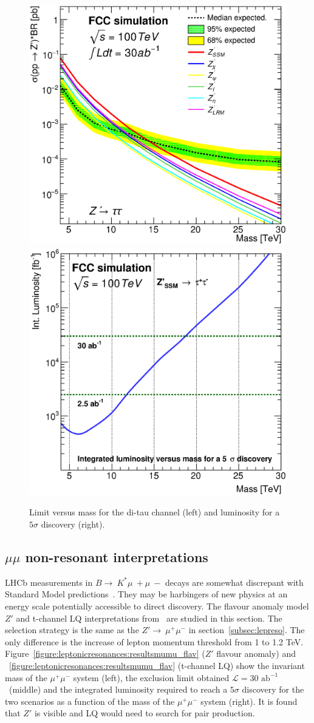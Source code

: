 \documentclass{cernrep}
\newcommand*{\intlumifcc}{\ensuremath{\mathcal{L}=30\text{ ab}^{-1}}}
\begin{document}
\begin{figure}[!htb]
  \centering
  \includegraphics[width=0.33\columnwidth]{Fig/lim_Zprime_tautau_fcc_v02_allxs.eps}
  \includegraphics[width=0.33\columnwidth]{Fig/DiscoveryPotential_tautau_rootStyle.eps}
  \caption{Limit versus mass for the di-tau channel (left) and luminosity for a $5\sigma$ discovery (right). }
  \label{figure:leptonicresonances:resultstautau}
\end{figure}


\subsection{\texorpdfstring{$\mu\mu$}{uu} non-resonant interpretations}
LHCb measurements in $B\rightarrow~K^*\mu~+\mu~−$ decays are somewhat discrepant with Standard Model predictions~\cite{Aaij:2014ora,Aaij:2017vbb}. They may be harbingers of new physics at an energy scale potentially accessible to direct discovery. The flavour anomaly model $Z'$ and t-channel LQ interpretations from~\cite{Allanach:2017bta} are studied in this section.
\newline
The selection strategy is the same as the $Z'\rightarrow~\mu^+\mu^-$ in section~\ref{subsec:lepreso}. The only difference is the increase of lepton momentum threshold from 1 to 1.2 TeV.
\newline
Figure~\ref{figure:leptonicresonances:resultsmumu_flav} ($Z'$ flavour anomaly) and ~\ref{figure:leptonicresonances:resultsmumu_flav} (t-channel LQ) show the invariant mass of the $\mu^+\mu^-$ system (left), the exclusion limit obtained \intlumifcc\ (middle) and the integrated luminosity required to reach a $5\sigma$ discovery for the two scenarios as a function of the mass of the $\mu^+\mu^-$ system (right).
It is found that $Z'$ is visible and LQ would need to search for pair production.
\end{document}
